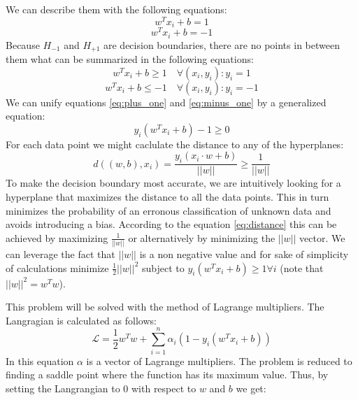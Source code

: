We can describe them with the following equations:
\begin{equation}
w^T x_i+b = 1
\end{equation}
\begin{equation}
w^T x_i+b = -1
\end{equation}
Because $H_{-1}$ and $H_{+1}$ are decision boundaries, there are no points in between them what can be summarized in the following equations:
\begin{equation} \label{eq:plus_one}
w^T x_i+b \ge 1 \quad \forall \left(x_i, y_i\right) : y_i=1
\end{equation}
\begin{equation} \label{eq:minus_one}
w^T x_i+b \le -1 \quad \forall \left(x_i, y_i\right) : y_i=-1
\end{equation}
We can unify equations \ref{eq:plus_one} and \ref{eq:minus_one} by a generalized equation:
\begin{equation}
y_i\left(w^T x_i+b\right)-1 \ge 0
\end{equation}
For each data point we might caclulate the distance to any of the hyperplanes:
\begin{equation} \label{eq:distance}
d\left(\left(w,b\right), x_i\right) = \frac{y_i\left(x_i\cdot w + b\right)}{||w||} \ge \frac{1}{||w||}
\end{equation}
To make the decision boundary most accurate, we are intuitively looking for a hyperplane that maximizes the distance to all the data points. This in turn minimizes the probability of an erronous classification of unknown data and avoids introducing a bias. According to the equation \ref{eq:distance} this can be achieved by maximizing $\frac{1}{||w||}$ or alternatively by minimizing the $||w||$ vector. We can leverage the fact that $||w||$ is a non negative value and for sake of simplicity of calculations minimize $\frac{1}{2}||w||^2$ subject to $y_i\left(w^T x_i+b\right) \ge 1 \forall i$ (note that $||w||^2=w^Tw$).

This problem will be solved with the method of Lagrange multipliers. The Langragian is calculated as follows:
\begin{equation}
\mathcal{L} = \frac{1}{2}w^Tw + \sum_{i=1}^{n}\alpha_i\left(1-y_i\left(w^Tx_i+b\right)\right)
\end{equation}
In this equation $\alpha$ is a vector of Lagrange multipliers. The problem is reduced to finding a saddle point where the function has its maximum value. Thus, by setting the Langrangian to 0 with respect to $w$ and $b$ we get:

